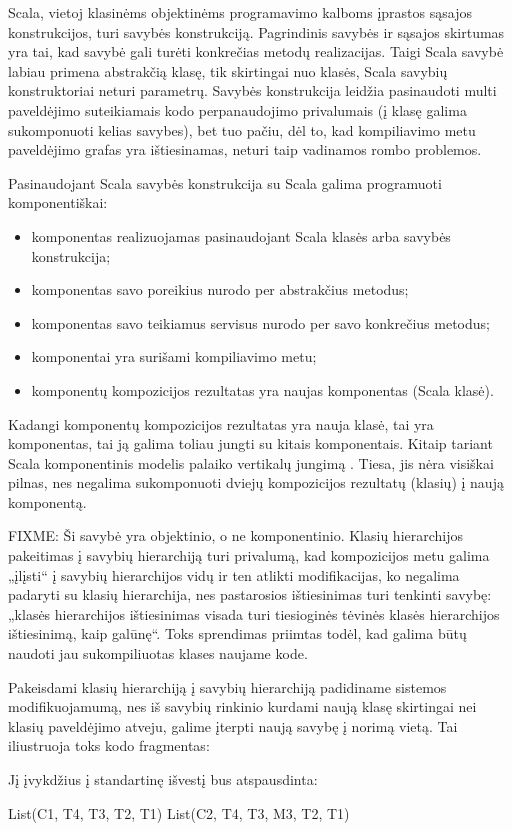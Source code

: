Scala, vietoj klasinėms objektinėms programavimo kalboms įprastos
sąsajos  konstrukcijos, turi savybės 
konstrukciją. Pagrindinis savybės ir sąsajos skirtumas yra tai, kad
savybė gali turėti konkrečias metodų realizacijas. Taigi Scala
savybė labiau primena abstrakčią klasę, tik skirtingai nuo klasės,
Scala savybių konstruktoriai neturi parametrų. Savybės konstrukcija
leidžia pasinaudoti multi paveldėjimo suteikiamais kodo perpanaudojimo
privalumais (į klasę galima sukomponuoti kelias savybes), bet tuo
pačiu, dėl to, kad kompiliavimo metu paveldėjimo grafas yra
ištiesinamas, neturi taip vadinamos rombo problemos.

Pasinaudojant Scala savybės konstrukcija su Scala galima programuoti
komponentiškai:
\begin{itemize}
  \item komponentas realizuojamas pasinaudojant Scala klasės arba
    savybės konstrukcija;
  \item komponentas savo poreikius nurodo per abstrakčius metodus;
  \item komponentas savo teikiamus servisus nurodo per savo konkrečius
    metodus;
  \item komponentai yra surišami kompiliavimo metu;
  \item komponentų kompozicijos rezultatas yra naujas komponentas
    (Scala klasė).
\end{itemize}
Kadangi komponentų kompozicijos rezultatas yra nauja klasė, tai yra
komponentas, tai ją galima toliau jungti su kitais komponentais.
Kitaip tariant Scala komponentinis modelis palaiko vertikalų
jungimą
\cite[598p.]{classification-framework-for-scm}.
Tiesa, jis nėra visiškai pilnas, nes negalima sukomponuoti dviejų
kompozicijos rezultatų (klasių) į naują komponentą.

FIXME: Ši savybė yra objektinio, o ne komponentinio.
Klasių hierarchijos pakeitimas į savybių hierarchiją turi privalumą,
kad kompozicijos metu galima „įlįsti“ į savybių hierarchijos vidų ir ten
atlikti modifikacijas, ko negalima padaryti su klasių hierarchija,
nes pastarosios ištiesinimas turi tenkinti savybę: „klasės hierarchijos
ištiesinimas visada turi tiesioginės tėvinės klasės hierarchijos
ištiesinimą, kaip galūnę“\cite[57p.]{scala-reference}. Toks sprendimas
priimtas todėl, kad galima būtų naudoti jau sukompiliuotas klases
naujame kode.

\begin{exmp}
  Pakeisdami klasių hierarchiją į savybių hierarchiją padidiname
  sistemos modifikuojamumą, nes iš savybių rinkinio kurdami naują
  klasę skirtingai nei klasių paveldėjimo atveju, galime įterpti
  naują savybę į norimą vietą. Tai iliustruoja toks kodo fragmentas:


  Jį įvykdžius į standartinę išvestį bus atspausdinta:

  \begin{textcode}
    List(C1, T4, T3, T2, T1)
    List(C2, T4, T3, M3, T2, T1)
  \end{textcode}

\end{exmp}

